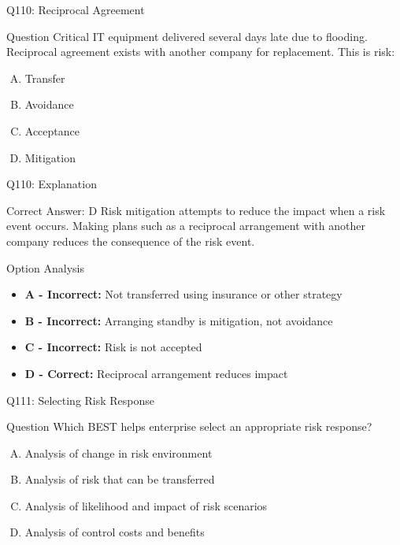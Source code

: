 \documentclass{beamer}
\begin{document}
	\begin{frame}{Q110: Reciprocal Agreement}
		\begin{block}{Question}
			Critical IT equipment delivered several days late due to flooding. Reciprocal agreement exists with another company for replacement. This is risk:
		\end{block}
		\begin{enumerate}[(A)]
			\item Transfer
			\item Avoidance
			\item Acceptance
			\item Mitigation
		\end{enumerate}
	\end{frame}
	
	\begin{frame}{Q110: Explanation}
		\begin{block}{Correct Answer: D}
			Risk mitigation attempts to reduce the impact when a risk event occurs. Making plans such as a reciprocal arrangement with another company reduces the consequence of the risk event.
		\end{block}
		\begin{block}{Option Analysis}
			\begin{itemize}
				\item \textbf{A - Incorrect:} Not transferred using insurance or other strategy
				\item \textbf{B - Incorrect:} Arranging standby is mitigation, not avoidance
				\item \textbf{C - Incorrect:} Risk is not accepted
				\item \textbf{D - Correct:} Reciprocal arrangement reduces impact
			\end{itemize}
		\end{block}
	\end{frame}
	
	\begin{frame}{Q111: Selecting Risk Response}
		\begin{block}{Question}
			Which BEST helps enterprise select an appropriate risk response?
		\end{block}
		\begin{enumerate}[(A)]
			\item Analysis of change in risk environment
			\item Analysis of risk that can be transferred
			\item Analysis of likelihood and impact of risk scenarios
			\item Analysis of control costs and benefits
		\end{enumerate}
	\end{frame}
	
\end{document}
